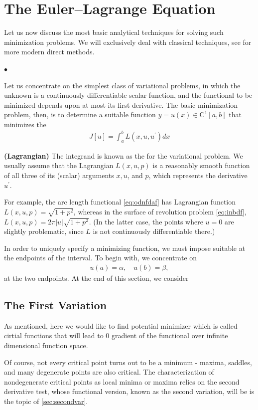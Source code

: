 \documentclass{article}
\newcommand{\bfs}[1]{\textbf{({#1}) }}
\begin{document}
\section{The Euler–Lagrange Equation}
Let us now discuss the most basic analytical techniques for solving such minimization problems. We will exclusively deal with classical techniques, see \cite{dacorogna2014introduction} for  more modern direct methods.

$\bullet$ 

Let us concentrate on the simplest class of variational problems, in which the unknown is a continuously differentiable scalar function, and the functional to be minimized depends upon at most its first derivative. The basic minimization problem, then, is to determine a suitable function $y=u(x) \in \mathrm{C}^{1}[a, b]$ that minimizes the 
\begin{align}
J[u]=\int_{a}^{b} L\left(x, u, u^{\prime}\right) d x \label{eq:odnmfa}
\end{align}
\begin{defa}\bfs{Lagrangian}
The integrand is known as the  for the variational problem. We usually assume that the Lagrangian $L(x, u, p)$ is a reasonably smooth function of all three of its (scalar) arguments $x, u$, and $p$, which represents the derivative $u^{\prime} .$
\end{defa}
\begin{exma}
For example, the arc length functional \cref{eq:odnfdaf} has Lagrangian function $L(x, u, p)=\sqrt{1+p^{2}}$, whereas in the surface of revolution problem \cref{eq:inbdf}, $L(x, u, p)=2 \pi|u| \sqrt{1+p^{2}}$. (In the latter case, the points where $u=0$ are slightly problematic, since $L$ is not continuously differentiable there.)
\end{exma}

In order to uniquely specify a minimizing function, we must impose suitable  at the endpoints of the interval. To begin with, we concentrate on 
\begin{align}
u(a)=\alpha, \quad u(b)=\beta,\label{eq:onmccz}
\end{align}
at the two endpoints. At the end of this section, we consider 

\subsection{The First Variation}
As mentioned, here we would like to find potential minimizer which is called cirtial functions that will lead to $0$ gradient of the functional over infinite dimensional function space.
\begin{rema}
Of course, not every critical point turns out to be a minimum - maxima, saddles, and many degenerate points are also critical. The characterization of nondegenerate critical points as local minima or maxima relies on the second derivative test, whose functional version, known as the second variation, will be is the topic of \cref{sec:secondvar}.
\end{rema}
\end{document}
